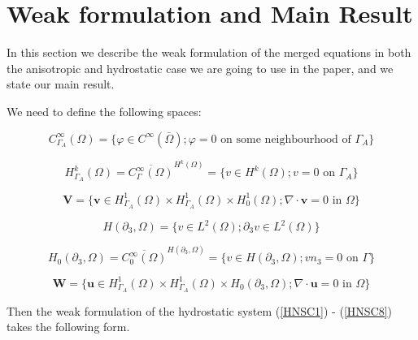 \documentclass[11pt]{article}
\begin{document}
\section{Weak formulation and Main Result} \label{weakformulationmainresult}

In this section we describe the weak formulation of the merged equations in both the anisotropic and hydrostatic case we are going to use in the paper, and we state our main result.
  
  We need to define the following spaces:
  
  \[ C^{\infty}_{\Gamma_A} (\Omega) = \{ \varphi \in C^\infty (\bar{\Omega}); \varphi = 0 \text{ on some neighbourhood of } \Gamma_A \} \]
  
  \[ H^k_{\Gamma_A} (\Omega) = \overline{C_\Gamma ^ \infty (\Omega)} ^ {H^k (\Omega)} = \{ v \in H^k(\Omega); v=0 \text{ on } \Gamma_A \} \]
  
  \[ \mathbf{V} = \{ \mathbf{v} \in  H^1_{\Gamma_A} (\Omega) \times H^1_{\Gamma_A} (\Omega) \times H^1_0 (\Omega); \nabla \cdot \mathbf{v} = 0 \text{ in } \Omega \} \]
  
  \[ H (\partial_3, \Omega) = \{ v \in L^2(\Omega); \partial_3 v \in L^2 (\Omega)\} \]
  
  \[ H_0 (\partial_3, \Omega) = \overline{C_0 ^\infty (\Omega)}^{H (\partial_3, \Omega)} = \{ v \in H(\partial_3, \Omega); v n_3 = 0 \text{ on } \Gamma \} \]
  
  \[ \mathbf{W} = \{ \mathbf{u} \in  H^1_{\Gamma_A} (\Omega) \times H^1_{\Gamma_A} (\Omega) \times H_0 (\partial_3, \Omega); \nabla \cdot \mathbf{u} = 0 \text{ in } \Omega \} \]
  
  Then the weak formulation of the hydrostatic system (\ref{HNSC1}) - (\ref{HNSC8}) takes the following form.
  
\end{document}

